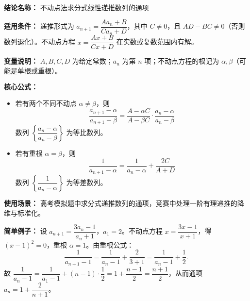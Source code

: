 \textbf{结论名称：} 不动点法求分式线性递推数列的通项

\textbf{适用条件：} 递推形式为 \( a_{n+1} = \dfrac{A a_n + B}{C a_n + D} \)，其中 \(C \neq 0\)，且 \(AD - BC \neq 0\)（否则数列退化）。不动点方程 \( x = \dfrac{Ax + B}{Cx + D} \) 在实数或复数范围内有解。

\textbf{变量说明：} \(A,B,C,D\) 为给定常数；\(a_n\) 为第 \(n\) 项；不动点方程的根记为 \(\alpha,\beta\)（可能是单根或重根）。

\textbf{核心公式：}
\begin{itemize}
\item 若有两个不同不动点 \(\alpha \neq \beta\)，则
\[
\boxed{ \dfrac{a_{n+1} - \alpha}{a_{n+1} - \beta} = \dfrac{A - \alpha C}{A - \beta C} \cdot \dfrac{a_n - \alpha}{a_n - \beta} }
\]
数列 \(\left\{ \dfrac{a_n - \alpha}{a_n - \beta} \right\}\) 为等比数列。

\item 若有重根 \(\alpha = \beta\)，则
\[
\boxed{ \dfrac{1}{a_{n+1} - \alpha} = \dfrac{1}{a_n - \alpha} + \dfrac{2C}{A + D} }
\]
数列 \(\left\{ \dfrac{1}{a_n - \alpha} \right\}\) 为等差数列。
\end{itemize}

\textbf{使用场景：} 高考模拟题中求分式递推数列的通项，竞赛中处理一阶有理递推的降维与标准化。

\textbf{简单例子：} 设 \(a_{n+1} = \dfrac{3a_n - 1}{a_n + 1}\)，\(a_1 = 2\)。不动点方程 \(x = \dfrac{3x-1}{x+1}\)，得 \((x-1)^2 =0\)，重根 \(\alpha =1\)。由重根公式：
\[
\dfrac{1}{a_{n+1} - 1} = \dfrac{1}{a_n - 1} + \dfrac{2}{3+1} = \dfrac{1}{a_n - 1} + \dfrac12 .
\]
故 \(\dfrac{1}{a_n - 1} = \dfrac{1}{a_1 - 1} + (n-1)\cdot\dfrac12 = 1 + \dfrac{n-1}{2} = \dfrac{n+1}{2}\)，从而通项 \(a_n = 1 + \dfrac{2}{n+1}\)。